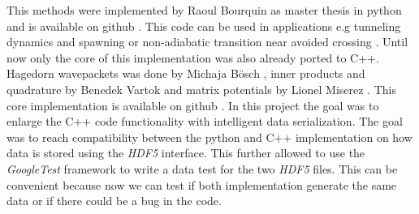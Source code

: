 This methods were implemented by Raoul Bourquin as master thesis \cite{B_master_thesis} in python and is available on github \cite{waveblocksnd}. This code can be used in applications e.g tunneling dynamics and spawning \cite{GHJ_tunneling_spawning} or non-adiabatic transition near avoided crossing \cite{BGH_natac}. Until now only the core of this implementation was also already ported to C++. Hagedorn wavepackets was done by Michaja B\"osch \cite{bt_michajab}, inner products and quadrature by Benedek Vartok \cite{st_benedekv} and matrix potentials by Lionel Miserez \cite{bt_lionelm}. This core implementation is available on github \cite{libwaveblocks}. In this project the goal was to enlarge the C++ code functionality with intelligent data serialization. The goal was to reach compatibility between the python and C++ implementation on how data is stored using the \textit{HDF5} interface. This further allowed to use the \textit{GoogleTest} framework to write a data test for the two \textit{HDF5} files. This can be convenient because now we can test if both implementation generate the same data or if there could be a bug in the code.